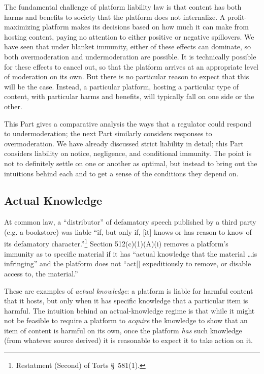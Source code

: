The fundamental challenge of platform liability law is that content has both harms and benefits to society that the platform does not internalize. A profit-maximizing platform makes its decisions based on how much it can make from hosting content, paying no attention to either positive or negative spillovers. We have seen that under blanket immunity, either of these effects can dominate, so both overmoderation and undermoderation are possible. It is technically possible for these effects to cancel out, so that the platform arrives at an appropriate level of moderation on its own. But there is no particular reason to expect that this will be the case. Instead, a particular platform, hosting a particular type of content, with particular harms and benefits, will typically fall on one side or the other.

This Part gives a comparative analysis the ways that a regulator could respond to undermoderation; the next Part similarly considers responses to overmoderation. We have already discussed strict liability in detail; this Part 
considers liability on notice, negligence, and conditional immunity. The point is not to definitely settle on one or another as optimal, but instead to bring out the intuitions behind each and to get a sense of the conditions they depend on.


\subsection{Actual Knowledge}
\label{sec:actualknowledge}

At common law, a ``distributor'' of defamatory speech published by a third party (e.g. a bookstore) was liable ``if, but only if, [it] knows or has reason to know of its defamatory character.''\footnote{Restatment (Second) of Torts §~581(1).}  Section 512(c)(1)(A)(i) removes a platform's immunity as to specific material if it has ``actual knowledge that the material \ldots is infringing'' and the platform does not ``act[] expeditiously to remove, or disable access to, the material.''

These are examples of \emph{actual knowledge}: a platform is liable for harmful content that it hosts, but only when it has specific knowledge that a particular item is harmful. The intuition behind an actual-knowledge regime is that while it might not be feasible to require a platform to \emph{acquire} the knowledge to show that an item of content is harmful on its own, once the platform \emph{has} such knowledge (from whatever source derived) it is reasonable to expect it to take action on it.

